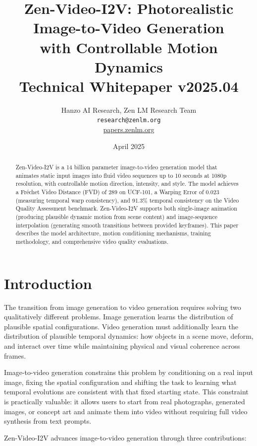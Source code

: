 \documentclass[11pt,a4paper]{article}
\title{\textbf{Zen-Video-I2V: Photorealistic Image-to-Video Generation\\
with Controllable Motion Dynamics}\\[0.5em]
\large Technical Whitepaper v2025.04}
\author{Hanzo AI Research, Zen LM Research Team\\
\texttt{research@zenlm.org}\\
\href{https://papers.zenlm.org}{papers.zenlm.org}}
\date{April 2025}
\begin{document}
\maketitle

\begin{abstract}
Zen-Video-I2V is a 14 billion parameter image-to-video generation model that animates static input images into fluid video sequences up to 10 seconds at 1080p resolution, with controllable motion direction, intensity, and style. The model achieves a Fr\'{e}chet Video Distance (FVD) of 289 on UCF-101, a Warping Error of 0.023 (measuring temporal warp consistency), and 91.3\% temporal consistency on the Video Quality Assessment benchmark. Zen-Video-I2V supports both single-image animation (producing plausible dynamic motion from scene content) and image-sequence interpolation (generating smooth transitions between provided keyframes). This paper describes the model architecture, motion conditioning mechanisms, training methodology, and comprehensive video quality evaluations.
\end{abstract}

\tableofcontents
\newpage

\section{Introduction}

The transition from image generation to video generation requires solving two qualitatively different problems. Image generation learns the distribution of plausible spatial configurations. Video generation must additionally learn the distribution of plausible temporal dynamics: how objects in a scene move, deform, and interact over time while maintaining physical and visual coherence across frames.

Image-to-video generation constrains this problem by conditioning on a real input image, fixing the spatial configuration and shifting the task to learning what temporal evolutions are consistent with that fixed starting state. This constraint is practically valuable: it allows users to start from real photographs, generated images, or concept art and animate them into video without requiring full video synthesis from text prompts.

Zen-Video-I2V advances image-to-video generation through three contributions:
\end{document}

